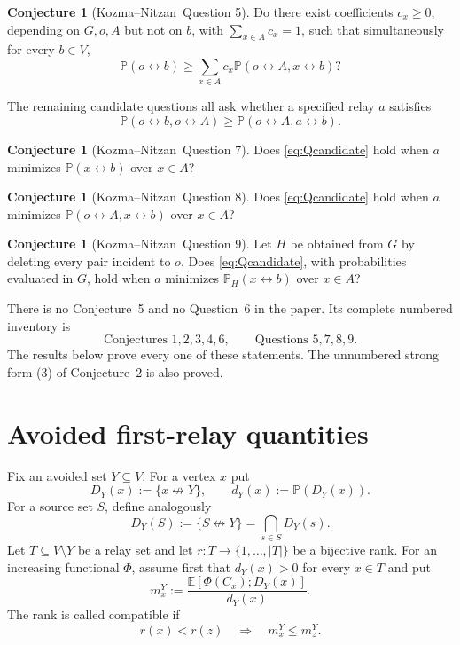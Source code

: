\documentclass[11pt]{article}
\theoremstyle{definition}
\newtheorem{conjecture}[theorem]{Conjecture}
\theoremstyle{remark}
\newcommand{\PP}{\mathbb P}
\newcommand{\EE}{\mathbb E}
\newcommand{\con}{\leftrightarrow}
\newcommand{\ncon}{\not\leftrightarrow}
\newcommand{\KN}{Kozma--Nitzan}
\begin{document}
\begin{conjecture}[\KN\ Question 5]
Do there exist coefficients $c_x\geq0$, depending on $G,o,A$ but not on
$b$, with $\sum_{x\in A}c_x=1$, such that simultaneously for every
$b\in V$,
\begin{equation}\label{eq:Q5}
 \PP(o\con b)\geq
 \sum_{x\in A}c_x\PP(o\con A,x\con b)?
\end{equation}
\end{conjecture}

The remaining candidate questions all ask whether a specified relay $a$
satisfies
\begin{equation}\label{eq:Qcandidate}
 \PP(o\con b,o\con A)\geq\PP(o\con A,a\con b).
\end{equation}

\begin{conjecture}[\KN\ Question 7]
Does \eqref{eq:Qcandidate} hold when $a$ minimizes
$\PP(x\con b)$ over $x\in A$?
\end{conjecture}

\begin{conjecture}[\KN\ Question 8]
Does \eqref{eq:Qcandidate} hold when $a$ minimizes
$\PP(o\con A,x\con b)$ over $x\in A$?
\end{conjecture}

\begin{conjecture}[\KN\ Question 9]
Let $H$ be obtained from $G$ by deleting every pair incident to $o$.
Does \eqref{eq:Qcandidate}, with probabilities evaluated in $G$, hold
when $a$ minimizes $\PP_H(x\con b)$ over $x\in A$?
\end{conjecture}

There is no Conjecture~5 and no Question~6 in the paper.  Its complete
numbered inventory is
\[
 \text{Conjectures }1,2,3,4,6,
 \qquad \text{Questions }5,7,8,9.
\]
The results below prove every one of these statements.  The unnumbered
strong form (3) of Conjecture~2 is also proved.

\section{Avoided first-relay quantities}\label{sec:definitions}

Fix an avoided set $Y\subseteq V$.  For a vertex $x$ put
\[
 D_Y(x):=\{x\ncon Y\},\qquad d_Y(x):=\PP(D_Y(x)).
\]
For a source set $S$, define analogously
\[
 D_Y(S):=\{S\ncon Y\}=\bigcap_{s\in S}D_Y(s).
\]
Let $T\subseteq V\setminus Y$ be a relay set and let
$r:T\to\{1,\ldots,|T|\}$ be a bijective rank.  For an increasing
functional $\Phi$, assume first that $d_Y(x)>0$ for every $x\in T$ and put
\begin{equation}\label{eq:condmean}
 m_x^Y:=\frac{\EE[\Phi(C_x);D_Y(x)]}{d_Y(x)}.
\end{equation}
The rank is called compatible if
\begin{equation}\label{eq:compatible}
 r(x)<r(z)\quad\Longrightarrow\quad m_x^Y\leq m_z^Y.
\end{equation}
\end{document}

